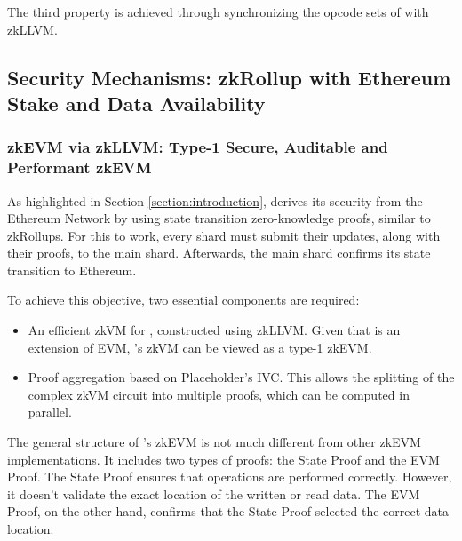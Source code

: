 The third property is achieved through synchronizing 
the opcode sets of \evm with zkLLVM.


\subsection{Security Mechanisms: zkRollup with Ethereum Stake and Data Availability}

\subsubsection{zkEVM via zkLLVM: Type-1 Secure, Auditable and Performant zkEVM}
\label{section:zkvm}

As highlighted in Section \ref{section:introduction}, 
\protocol derives its security from the Ethereum Network 
by using state transition zero-knowledge proofs, similar 
to zkRollups. 
For this to work, every shard must submit 
their updates, along with their proofs, to the main shard. 
Afterwards, the main shard confirms its state transition to Ethereum.

To achieve this objective, two essential components are required:
\begin{itemize}
    \item An efficient zkVM for \evm, constructed using zkLLVM. 
        Given that \evm is an extension of EVM, 
        \nil's zkVM can be viewed as a type-1 zkEVM.
    \item Proof aggregation based on Placeholder's IVC. 
        This allows the splitting of the complex zkVM circuit into 
        multiple proofs, which can be computed in parallel. 
\end{itemize}

The general structure of \nil's zkEVM is not much different 
from other zkEVM implementations. 
It includes two types of proofs: the State Proof and the EVM Proof. 
The State Proof ensures that operations are performed correctly. 
However, it doesn't validate the exact location of the written or read data. 
The EVM Proof, on the other hand, confirms that the State Proof 
selected the correct data location.

